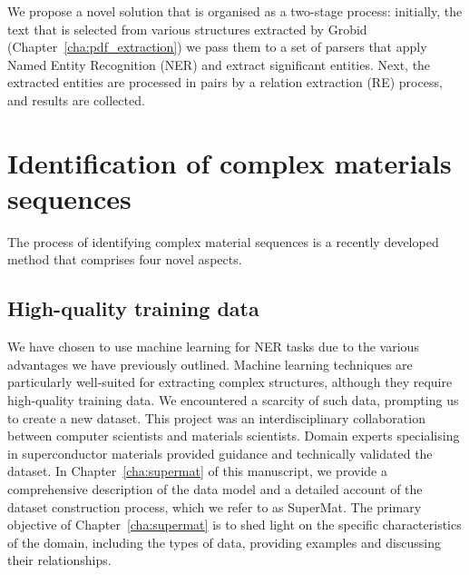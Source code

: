 We propose a novel solution that is organised as a two-stage process: initially, the text that is selected from various structures extracted by Grobid (Chapter~\ref{cha:pdf_extraction}) we pass them to a set of parsers that apply Named Entity Recognition (NER) and extract significant entities.
Next, the extracted entities are processed in pairs by a relation extraction (RE) process, and results are collected.


\section{Identification of complex materials sequences}
\label{subsec:ner-solution}

The process of identifying complex material sequences is a recently developed method that comprises four novel aspects.

\subsection{High-quality training data}
We have chosen to use machine learning for NER tasks due to the various advantages we have previously outlined. Machine learning techniques are particularly well-suited for extracting complex structures, although they require high-quality training data. We encountered a scarcity of such data, prompting us to create a new dataset. This project was an interdisciplinary collaboration between computer scientists and materials scientists. Domain experts specialising in superconductor materials provided guidance and technically validated the dataset. 
In Chapter~\ref{cha:supermat} of this manuscript, we provide a comprehensive description of the data model and a detailed account of the dataset construction process, which we refer to as SuperMat. The primary objective of Chapter~\ref{cha:supermat} is to shed light on the specific characteristics of the domain, including the types of data, providing examples and discussing their relationships.

